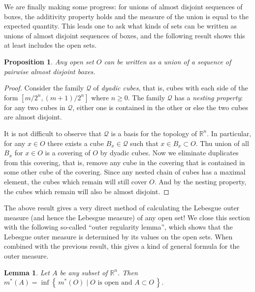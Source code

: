\documentclass[11pt,oneside]{amsbook}
\newcommand{\set}[1]{\left\{\,#1\,\right\}}
\newcommand{\RR}{{\mathbb R}}
\theoremstyle{definition}
\theoremstyle{plain}
\newtheorem{lem}[thm]{Lemma}
\newtheorem{prop}[thm]{Proposition}
\theoremstyle{definition}
\theoremstyle{remark}
\numberwithin{equation}{section}
\numberwithin{figure}{section}
\begin{document}
We are finally making some progress: for unions of almost disjoint sequences of boxes, the additivity property holds and the measure of the union is equal to the expected quantity. This leads one to ask what kinds of sets can be written as unions of almost disjoint sequences of boxes, and the following result shows this at least includes the open sets.

\begin{prop}
  \label{prop:open-decomp}
  Any open set $O$ can be written as a union of a sequence of pairwise almost disjoint boxes.
\end{prop}

\begin{proof}
  Consider the family $\mathcal Q$ of \emph{dyadic cubes}, that is, cubes with each side of the form $[m/2^n,(m+1)/2^n]$ where $n\geq0$. The family $\mathcal Q$ has a \emph{nesting property}: for any two cubes in $\mathcal Q$, either one is contained in the other or else the two cubes are almost disjoint.

  It is not difficult to observe that $\mathcal Q$ is a basis for the topology of $\RR^n$. In particular, for any $x\in O$ there exists a cube $B_x\in\mathcal Q$ such that $x\in B_x\subset O$. Thu union of all $B_x$ for $x\in O$ is a covering of $O$ by dyadic cubes. Now we eliminate duplicates from this covering, that is, remove any cube in the covering that is contained in some other cube of the covering. Since any nested chain of cubes has a maximal element, the cubes which remain will still cover $O$. And by the nesting property, the cubes which remain will also be almost disjoint.
\end{proof}

The above result gives a very direct method of calculating the Lebesgue outer measure (and hence the Lebesgue measure) of any open set! We close this section with the following so-called ``outer regularity lemma'', which shows that the Lebesgue outer measure is determined by its values on the open sets. When combined with the previous result, this gives a kind of general formula for the outer measure.


\begin{lem}
  Let $A$ be any subset of $\RR^n$. Then $m^*(A)=\inf\set{m^*(O)\mid\text{$O$ is open and }A\subset O}$.
\end{lem}
\end{document}
